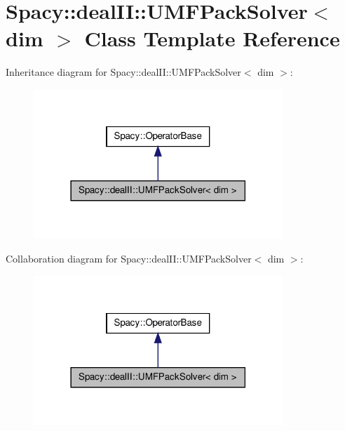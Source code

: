 \hypertarget{classSpacy_1_1dealII_1_1UMFPackSolver}{\section{\-Spacy\-:\-:deal\-I\-I\-:\-:\-U\-M\-F\-Pack\-Solver$<$ dim $>$ \-Class \-Template \-Reference}
\label{classSpacy_1_1dealII_1_1UMFPackSolver}
}


\-Inheritance diagram for \-Spacy\-:\-:deal\-I\-I\-:\-:\-U\-M\-F\-Pack\-Solver$<$ dim $>$\-:
\nopagebreak
\begin{figure}[H]
\begin{center}
\leavevmode
\includegraphics[width=266pt]{classSpacy_1_1dealII_1_1UMFPackSolver__inherit__graph}
\end{center}
\end{figure}


\-Collaboration diagram for \-Spacy\-:\-:deal\-I\-I\-:\-:\-U\-M\-F\-Pack\-Solver$<$ dim $>$\-:
\nopagebreak
\begin{figure}[H]
\begin{center}
\leavevmode
\includegraphics[width=266pt]{classSpacy_1_1dealII_1_1UMFPackSolver__coll__graph}
\end{center}
\end{figure}
